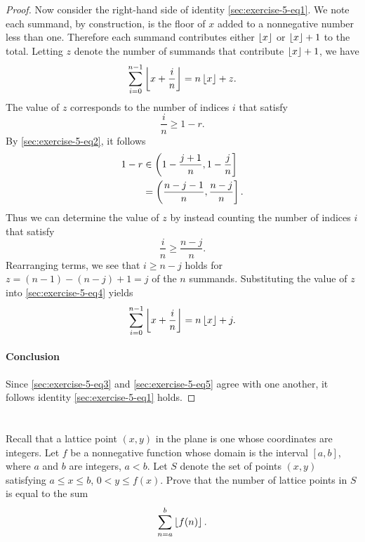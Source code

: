 \documentclass{article}
\begin{document}
\begin{proof}
    Now consider the right-hand side of identity \eqref{sec:exercise-5-eq1}.
    We note each summand, by construction, is the floor of $x$ added to a
      nonnegative number less than one.
    Therefore each summand contributes either $\left\lfloor x\right\rfloor$ or $\left\lfloor x\right\rfloor + 1$ to
      the total.
    Letting $z$ denote the number of summands that contribute $\left\lfloor x\right\rfloor + 1$,
      we have
      \begin{equation}
        \label{sec:exercise-5-eq4}
        \sum_{i=0}^{n-1} \left\lfloor x + \frac{i}{n}\right\rfloor = n\left\lfloor x\right\rfloor + z.
      \end{equation}
    The value of $z$ corresponds to the number of indices $i$ that satisfy
      $$\frac{i}{n} \geq 1 - r.$$
    By \eqref{sec:exercise-5-eq2}, it follows
      \begin{align*}
        1 - r
          & \in \left(1 - \frac{j+1}{n}, 1-\frac{j}{n}\right] \\
          & = \left(\frac{n - j - 1}{n}, \frac{n - j}{n}\right].
      \end{align*}
    Thus we can determine the value of $z$ by instead counting the number of
      indices $i$ that satisfy $$\frac{i}{n} \geq \frac{n - j}{n}.$$
    Rearranging terms, we see that $i \geq n - j$ holds for
      $z = (n - 1) - (n - j) + 1 = j$ of the $n$ summands.
    Substituting the value of $z$ into \eqref{sec:exercise-5-eq4} yields
      \begin{equation}
        \label{sec:exercise-5-eq5}
        \sum_{i=0}^{n-1} \left\lfloor x + \frac{i}{n}\right\rfloor = n\left\lfloor x\right\rfloor + j.
      \end{equation}

  \paragraph{Conclusion}%

    Since \eqref{sec:exercise-5-eq3} and \eqref{sec:exercise-5-eq5} agree with
    one another, it follows identity \eqref{sec:exercise-5-eq1} holds.

\end{proof}

\section*{}%
%

Recall that a lattice point $(x, y)$ in the plane is one whose coordinates are
  integers.
Let $f$ be a nonnegative function whose domain is the interval $[a, b]$, where
  $a$ and $b$ are integers, $a < b$.
Let $S$ denote the set of points $(x, y)$ satisfying $a \leq x \leq b$,
  $0 < y \leq f(x)$.
Prove that the number of lattice points in $S$ is equal to the sum
  $$\sum_{n=a}^b \left\lfloor f(n)\right\rfloor.$$
\end{document}
